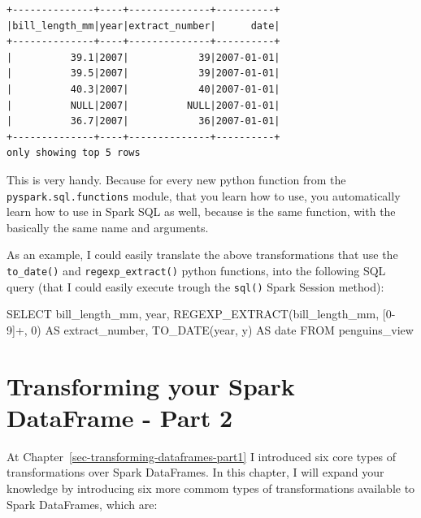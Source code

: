\documentclass[
  11pt,
  letterpaper,
  DIV=11,
  numbers=noendperiod]{scrreprt}
\newenvironment{Shaded}{\begin{snugshade}}{\end{snugshade}}
\newcommand{\DataTypeTok}[1]{\textcolor[rgb]{0.68,0.00,0.00}{#1}}
\newcommand{\DecValTok}[1]{\textcolor[rgb]{0.68,0.00,0.00}{#1}}
\newcommand{\FunctionTok}[1]{\textcolor[rgb]{0.28,0.35,0.67}{#1}}
\newcommand{\KeywordTok}[1]{\textcolor[rgb]{0.00,0.23,0.31}{#1}}
\newcommand{\NormalTok}[1]{\textcolor[rgb]{0.00,0.23,0.31}{#1}}
\newcommand{\StringTok}[1]{\textcolor[rgb]{0.13,0.47,0.30}{#1}}
\begin{document}
\begin{verbatim}
+--------------+----+--------------+----------+
|bill_length_mm|year|extract_number|      date|
+--------------+----+--------------+----------+
|          39.1|2007|            39|2007-01-01|
|          39.5|2007|            39|2007-01-01|
|          40.3|2007|            40|2007-01-01|
|          NULL|2007|          NULL|2007-01-01|
|          36.7|2007|            36|2007-01-01|
+--------------+----+--------------+----------+
only showing top 5 rows
\end{verbatim}

This is very handy. Because for every new python function from the
\texttt{pyspark.sql.functions} module, that you learn how to use, you
automatically learn how to use in Spark SQL as well, because is the same
function, with the basically the same name and arguments.

As an example, I could easily translate the above transformations that
use the \texttt{to\_date()} and \texttt{regexp\_extract()} python
functions, into the following SQL query (that I could easily execute
trough the \texttt{sql()} Spark Session method):

\begin{Shaded}
\begin{Highlighting}[]
\KeywordTok{SELECT} 
\NormalTok{  bill\_length\_mm, }\DataTypeTok{year}\NormalTok{,}
\NormalTok{  REGEXP\_EXTRACT(bill\_length\_mm, }\StringTok{\textquotesingle{}[0{-}9]+\textquotesingle{}}\NormalTok{, }\DecValTok{0}\NormalTok{) }\KeywordTok{AS}\NormalTok{ extract\_number,}
  \FunctionTok{TO\_DATE}\NormalTok{(}\DataTypeTok{year}\NormalTok{, }\StringTok{\textquotesingle{}y\textquotesingle{}}\NormalTok{) }\KeywordTok{AS} \DataTypeTok{date}
\KeywordTok{FROM}\NormalTok{ penguins\_view}
\end{Highlighting}
\end{Shaded}


\chapter{Transforming your Spark DataFrame - Part
2}\label{transforming-your-spark-dataframe---part-2}

At Chapter~\ref{sec-transforming-dataframes-part1} I introduced six core
types of transformations over Spark DataFrames. In this chapter, I will
expand your knowledge by introducing six more commom types of
transformations available to Spark DataFrames, which are:
\end{document}
